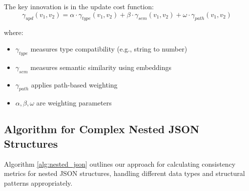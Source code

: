 \documentclass[letterpaper]{article} %
\begin{document}
The key innovation is in the update cost function:
\begin{equation}
\gamma_{upd}(v_1, v_2) = \alpha \cdot \gamma_{type}(v_1, v_2) + \beta \cdot \gamma_{sem}(v_1, v_2) + \omega \cdot \gamma_{path}(v_1, v_2)
\end{equation}

where:
\begin{itemize}
\item $\gamma_{type}$ measures type compatibility (e.g., string to number)
\item $\gamma_{sem}$ measures semantic similarity using embeddings
\item $\gamma_{path}$ applies path-based weighting
\item $\alpha, \beta, \omega$ are weighting parameters
\end{itemize}

\subsection{Algorithm for Complex Nested JSON Structures}

Algorithm \ref{alg:nested_json} outlines our approach for calculating consistency metrics for nested JSON structures, handling different data types and structural patterns appropriately.
\end{document}

